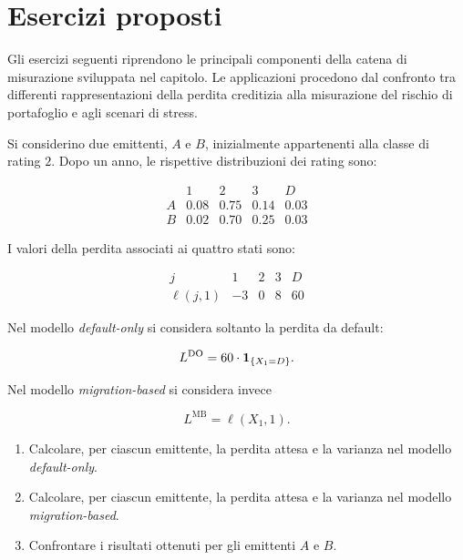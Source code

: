 \section{Esercizi proposti}

\label{sec:cap09-esercizi-proposti}

Gli esercizi seguenti riprendono le principali componenti della catena
di misurazione sviluppata nel capitolo. Le applicazioni procedono dal
confronto tra differenti rappresentazioni della perdita creditizia
alla misurazione del rischio di portafoglio e agli scenari di stress.

\begin{exercise}

\label{ex:cap09-default-only-migration-based}

Si considerino due emittenti, $A$ e $B$, inizialmente appartenenti alla
classe di rating $2$. Dopo un anno, le rispettive distribuzioni dei
rating sono:

\[
\begin{array}{c|cccc}
&
1
&
2
&
3
&
D
\\
\hline
A
&
0.08
&
0.75
&
0.14
&
0.03
\\
B
&
0.02
&
0.70
&
0.25
&
0.03
\end{array}
\]

I valori della perdita associati ai quattro stati sono:

\[
\begin{array}{c|cccc}
j
&
1
&
2
&
3
&
D
\\
\hline
\ell(j,1)
&
-3
&
0
&
8
&
60
\end{array}
\]

Nel modello \emph{default-only} si considera soltanto la perdita da
default:

\[
L^{\mathrm{DO}}
=
60\cdot\mathbf{1}_{\{X_1=D\}}.
\]

Nel modello \emph{migration-based} si considera invece

\[
L^{\mathrm{MB}}
=
\ell(X_1,1).
\]

\begin{enumerate}

\item Calcolare, per ciascun emittente, la perdita attesa e la varianza
nel modello \emph{default-only}.

\item Calcolare, per ciascun emittente, la perdita attesa e la varianza
nel modello \emph{migration-based}.

\item Confrontare i risultati ottenuti per gli emittenti $A$ e $B$.


\end{enumerate}
\end{exercise}
